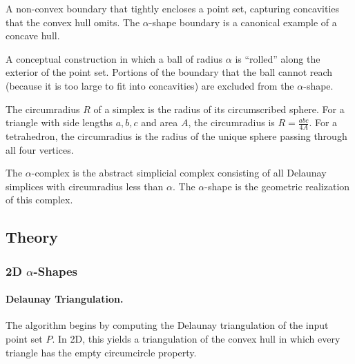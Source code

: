 \begin{definition}\label{def:concave_hull}
A non-convex boundary that tightly encloses a point set, capturing concavities that the convex hull omits. The $\alpha$-shape boundary is a canonical example of a concave hull.
\end{definition}

\begin{definition}\label{def:rolling_ball}
A conceptual construction in which a ball of radius $\alpha$ is ``rolled'' along the exterior of the point set. Portions of the boundary that the ball cannot reach (because it is too large to fit into concavities) are excluded from the $\alpha$-shape.
\end{definition}

\begin{definition}[Circumradius]\label{def:circumradius_alpha}
The circumradius $R$ of a simplex is the radius of its circumscribed sphere. For a triangle with side lengths $a, b, c$ and area $A$, the circumradius is $R = \frac{abc}{4A}$. For a tetrahedron, the circumradius is the radius of the unique sphere passing through all four vertices.
\end{definition}

\begin{definition}\label{def:alpha_complex}
The $\alpha$-complex is the abstract simplicial complex consisting of all Delaunay simplices with circumradius less than $\alpha$. The $\alpha$-shape is the geometric realization of this complex.
\end{definition}

\subsection{Theory}

\subsubsection{2D $\alpha$-Shapes}

\paragraph{Delaunay Triangulation.}
The algorithm begins by computing the Delaunay triangulation of the input point set $P$. In 2D, this yields a triangulation of the convex hull in which every triangle has the empty circumcircle property.

